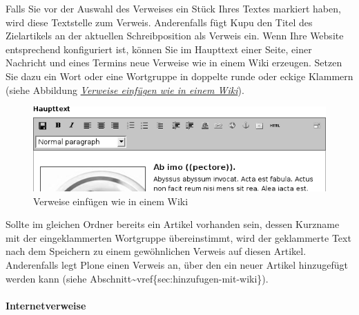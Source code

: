 \documentclass[a4paper,12pt,ngerman]{manual}
\begin{document}
Falls Sie vor der Auswahl des Verweises ein Stück Ihres Textes markiert haben,
wird diese Textstelle zum Verweis. Anderenfalls fügt Kupu den Titel des
Zielartikels an der aktuellen Schreibposition als Verweis ein.
\hypertarget{sec-wiki-verweise}{}
Wenn Ihre Website entsprechend konfiguriert ist, können Sie im Haupttext einer
Seite, einer Nachricht und eines Termins neue Verweise wie in einem Wiki
erzeugen. Setzen Sie dazu ein Wort oder eine Wortgruppe in doppelte runde oder
eckige Klammern (siehe Abbildung \hyperlink{fig-bearbeiten-wiki}{\emph{Verweise einfügen wie in einem Wiki}}).
\hypertarget{fig-bearbeiten-wiki}{}\begin{figure}[htbp]
\centering

\includegraphics{bearbeiten-wiki.png}
\caption{Verweise einfügen wie in einem Wiki}\end{figure}

Sollte im gleichen Ordner bereits ein Artikel vorhanden sein, dessen Kurzname
mit der eingeklammerten Wortgruppe übereinstimmt, wird der geklammerte Text
nach dem Speichern zu einem gewöhnlichen Verweis auf diesen Artikel.
Anderenfalls legt Plone einen Verweis an, über den ein neuer Artikel
hinzugefügt werden kann (siehe Abschnitt\textasciitilde{}vref\{sec:hinzufugen-mit-wiki\}).


\paragraph{Internetverweise}
\end{document}
